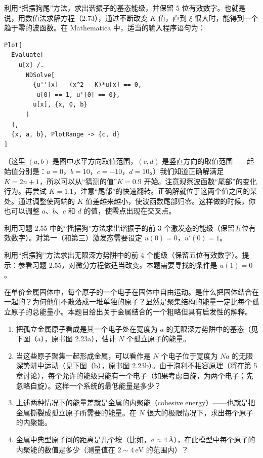 利用“摇摆狗尾”方法，求出谐振子的基态能级，并保留 5 位有效数字。也就是说，用数值法求解方程（2.73），通过不断改变 $K$ 值，直到 $\xi$ 很大时，能得到一个趋于零的波函数。在 Mathematica 中，适当的输入程序语句为：
\begingroup\small
\begin{verbatim}
Plot[
  Evaluate[
    u[x] /.
      NDSolve[
        {u''[x] - (x^2 - K)*u[x] == 0,
         u[0] == 1, u'[0] == 0},
        u[x], {x, 0, b}
      ]
  ],
  {x, a, b}, PlotRange -> {c, d}
]
\end{verbatim}
\endgroup
（这里 $(a,b)$ 是图中水平方向取值范围，$(c,d)$ 是竖直方向的取值范围——起始值分别是：$a=0$，$b=10$，$c=-10$，$d=10$。）我们知道正确解满足 $K=2n+1$，所以可以从“猜测的值”$K=0.9$ 开始。注意观察波函数“尾部”的变化行为。再尝试 $K=1.1$，注意“尾部”的快速翻转。正确解就位于这两个值之间的某处。通过调整使两端的 $K$ 值差越来越小，使波函数尾部归零。这样做的时候，你也可以调整 $a$、$b$、$c$ 和 $d$ 的值，使零点出现在交叉点。
\vfill

利用习题 2.55 中的“摇摆狗”方法求出谐振子的前 3 个激发态的能级（保留五位有效数字）。对第一（和第三）激发态需要设定 $u(0)=0$，$u'(0)=1$。
\vfill

利用“摇摆狗”方法求出无限深方势阱中的前 4 个能级（保留五位有效数字）。提示：参看习题 2.55，对微分方程做适当改变。本题需要寻找的条件是 $u(1)=0$。
\vfill

在单价金属固体中，每个原子的一个电子在固体中自由运动。是什么把固体结合在一起的？为何他们不散落成一堆单独的原子？显然是聚集结构的能量一定比每个孤立原子的总能量小。本题目给出关于金属结合的一个粗略但具有启发性的解释。
\begin{enumerate}
\item 把孤立金属原子看成是其一个电子处在宽度为 $a$ 的无限深方势阱中的基态（见下图（a），原书图 2.23a），估计 $N$ 个孤立原子的能量。
\item 当这些原子聚集一起形成金属，可以看作是 $N$ 个电子位于宽度为 $Na$ 的无限深势阱中运动（见下图（b），原书图 2.23b）。由于泡利不相容原理（将在第 5 章讨论），每个允许的能级只能有一个电子（如果考虑自旋，为两个电子；先忽略自旋）。这样一个系统的最低能量是多少？
\item 上述两种情况下的能量差就是金属的内聚能（cohesive energy）——也就是把金属撕裂成孤立原子所需要的能量。在 $N$ 很大的极限情况下，求出每个原子的内聚能。
\item 金属中典型原子间的距离是几个埃（比如，$a\approx4\,\text{\AA}$），在此模型中每个原子的内聚能的数值是多少（测量值在 $2\sim4\,\mathrm{eV}$ 的范围内）？
\end{enumerate}
\begin{center}

\par{}
\end{center}
\vfill


